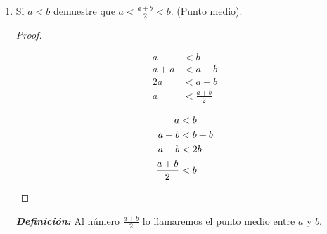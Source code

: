 \documentclass[11pt]{article}
\newcommand{\R}{\mathbb{R}}
\newcommand{\bfit}[1]{\textbf{\textit{#1}}}
\begin{document}
\begin{enumerate}[label=\alph*)]

 \item Si $a<b$ demuestre que $a<\frac{a+b}{2}<b$. (Punto medio).
 \begin{proof} \leavevmode%
  \begin{center}\vspace{-2em}
  \begin{minipage}[r]{.4\linewidth}
  \begin{align*}
  a &< b \\
  a + a &< a+b \\
  2a &< a+b \\
  a &< \frac{a+b}{2}
  \end{align*}
  \end{minipage}%
  \begin{minipage}[l]{.4\linewidth}
  \begin{align*}
  a &< b \\
  a + b &< b+b \\
  a +b &< 2b \\
  \frac{a+b}{2} &< b \qedhere
  \end{align*}
  \end{minipage}%
  \end{center}%
 \end{proof}
 \bfit{Definición:}  Al número $\frac{a+b}{2}$ lo llamaremos el punto medio entre $a$ y $b$.




\end{enumerate}
\end{document}
